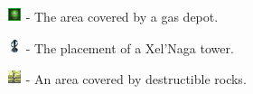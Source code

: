 \begin{my_itemize}
	\item \includegraphics[scale=0.7]{Images/Tiles/Gas} - The area covered by a gas depot.

	\item \includegraphics[scale=0.7]{Images/Tiles/XelNaga} - The placement of a Xel'Naga tower.

	\item \includegraphics[scale=0.7]{Images/Tiles/DestructibleRocks} - An area covered by destructible rocks.

\end{my_itemize}